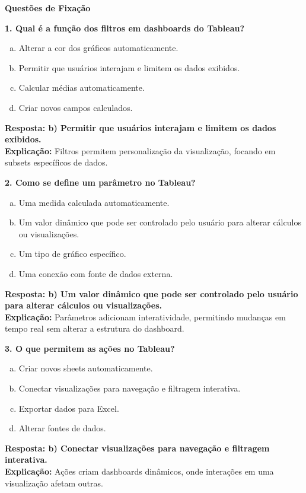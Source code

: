 \begin{SolvedBox}[orange]
\textbf{Questões de Fixação}

\textbf{1. Qual é a função dos filtros em dashboards do Tableau?}

\begin{enumerate}[a)]
  \item Alterar a cor dos gráficos automaticamente.
  \item Permitir que usuários interajam e limitem os dados exibidos.
  \item Calcular médias automaticamente.
  \item Criar novos campos calculados.
\end{enumerate}

\textbf{Resposta: b) Permitir que usuários interajam e limitem os dados exibidos.} \\
\textbf{Explicação:} Filtros permitem personalização da visualização, focando em subsets específicos de dados.

\textbf{2. Como se define um parâmetro no Tableau?}

\begin{enumerate}[a)]
  \item Uma medida calculada automaticamente.
  \item Um valor dinâmico que pode ser controlado pelo usuário para alterar cálculos ou visualizações.
  \item Um tipo de gráfico específico.
  \item Uma conexão com fonte de dados externa.
\end{enumerate}

\textbf{Resposta: b) Um valor dinâmico que pode ser controlado pelo usuário para alterar cálculos ou visualizações.} \\
\textbf{Explicação:} Parâmetros adicionam interatividade, permitindo mudanças em tempo real sem alterar a estrutura do dashboard.

\textbf{3. O que permitem as ações no Tableau?}

\begin{enumerate}[a)]
  \item Criar novos sheets automaticamente.
  \item Conectar visualizações para navegação e filtragem interativa.
  \item Exportar dados para Excel.
  \item Alterar fontes de dados.
\end{enumerate}

\textbf{Resposta: b) Conectar visualizações para navegação e filtragem interativa.} \\
\textbf{Explicação:} Ações criam dashboards dinâmicos, onde interações em uma visualização afetam outras.
\end{SolvedBox}

